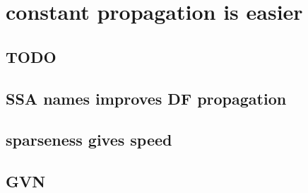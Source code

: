 \applynumberofpages\chapter{constant propagation is easier }
\section{TODO}


\section{SSA names improves DF propagation}
\section{sparseness gives speed}
\section{GVN}
